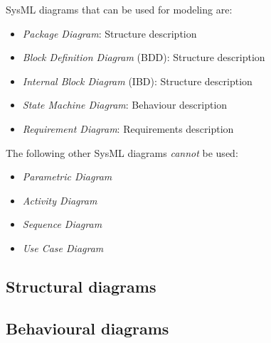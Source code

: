 SysML diagrams that can be used for modeling are:
\begin{itemize}
\item \emph{Package Diagram}: Structure description
\item \emph{Block Definition Diagram} (BDD): Structure description
\item \emph{Internal Block Diagram} (IBD): Structure description
\item \emph{State Machine Diagram}: Behaviour description
\item \emph{Requirement Diagram}: Requirements description
\end{itemize}

The following other SysML diagrams \emph{cannot} be used:
\begin{itemize}
\item \emph{Parametric Diagram}
\item \emph{Activity Diagram}
\item \emph{Sequence Diagram}
\item \emph{Use Case Diagram}
\end{itemize}


\subsection{Structural  diagrams}

\begin{comment}
Why ? When ? How ?

First ideas :

  	\begin{itemize}
  		\item package 
  		\item BDD 
  		\item IBD 
  		 	\begin{itemize}
  				\item requirement
  				\item ... ?
			\end{itemize}  	
  		\item parameters 
	\end{itemize}  	    


\end{comment}


\subsection{Behavioural diagrams}


